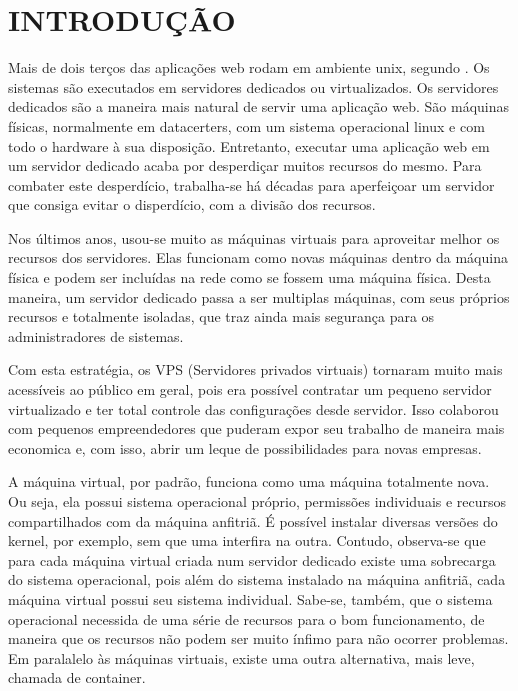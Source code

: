\documentclass[
	12pt,				%
	openright,			%
	oneside,			%
	a4paper,			%
	chapter=TITLE,		%
	section=TITLE,		%
	english,			%
	french,				%
	spanish,			%
	brazil				%
	]{abntex2}
\begin{document}


\chapter{INTRODUÇÃO}

Mais de dois terços das aplicações web rodam em ambiente unix, segundo . Os sistemas são executados em servidores dedicados ou virtualizados. Os servidores dedicados são a maneira mais natural de servir uma aplicação web. São máquinas físicas, normalmente em datacerters, com um sistema operacional linux e com todo o hardware à sua disposição.
Entretanto, executar uma aplicação web em um servidor dedicado acaba por desperdiçar muitos recursos do mesmo. Para combater este desperdício, trabalha-se há décadas para aperfeiçoar um servidor que consiga evitar o disperdício, com a divisão dos recursos.

Nos últimos anos, usou-se muito as máquinas virtuais para aproveitar melhor os recursos dos servidores. Elas funcionam como novas máquinas dentro da máquina física e podem ser incluídas na rede como se fossem uma máquina física. Desta maneira, um servidor dedicado passa a ser multiplas máquinas, com seus próprios recursos e totalmente isoladas, que traz ainda mais segurança para os administradores de sistemas.

Com esta estratégia, os VPS (Servidores privados virtuais) tornaram muito mais acessíveis ao público em geral, pois era possível contratar um pequeno servidor virtualizado e ter total controle das configurações desde servidor. Isso colaborou com pequenos empreendedores que puderam expor seu trabalho de maneira mais economica e, com isso, abrir um leque de possibilidades para novas empresas.

A máquina virtual, por padrão, funciona como uma máquina totalmente nova. Ou seja, ela possui sistema operacional próprio, permissões individuais e recursos compartilhados com da máquina anfitriã. É possível instalar diversas versões do kernel, por exemplo, sem que uma interfira na outra. Contudo, observa-se que para cada máquina virtual criada num servidor dedicado existe uma sobrecarga do sistema operacional, pois além do sistema instalado na máquina anfitriã, cada máquina virtual possui seu sistema individual. Sabe-se, também, que o sistema operacional necessida de uma série de recursos para o bom funcionamento, de maneira que os recursos não podem ser muito ínfimo para não ocorrer problemas. Em paralalelo às máquinas virtuais, existe uma outra alternativa, mais leve, chamada de container.
\end{document}
